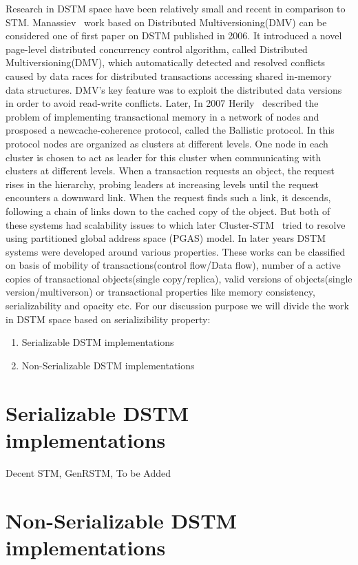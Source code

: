 \documentclass[12pt,english]{report}
\begin{document}
Research in DSTM space have been relatively small and recent in comparison to STM. Manassiev~\cite{Manassiev:2006:EDV:1122971.1123002} work based on Distributed Multiversioning(DMV) can be considered one of first paper on DSTM published in 2006. It
introduced a novel page-level distributed concurrency control algorithm, called Distributed Multiversioning(DMV), which automatically detected and resolved conflicts caused by data races for distributed transactions accessing shared in-memory data structures. DMV’s key feature was to exploit the distributed data versions in order to avoid read-write conflicts. Later,
In 2007 Herily~\cite{Herilhy:2007:BallisticProtocal} described the problem of implementing transactional memory in a network of nodes and prosposed a newcache-coherence protocol,
called the Ballistic protocol. In this protocol nodes are organized as clusters at different levels. One node in each cluster is chosen to act as leader for this cluster when communicating with clusters at different levels. When a transaction requests an object, the request rises in the hierarchy, probing leaders at increasing levels until the request encounters a downward link. When the request finds such a link, it descends, following a chain of links down to the cached copy of the object. But both of these systems had scalability issues to which later Cluster-STM~\cite{Bocchino:2008:STM:1345206.1345242} tried to resolve using partitioned global address space (PGAS) model. In later years DSTM systems were developed around various properties. These works can be classified on basis of mobility of transactions(control flow/Data flow), number of a active copies of transactional objects(single copy/replica), valid versions of objects(single version/multiverson) or transactional properties like memory consistency, serializability and opacity etc. For our discussion purpose we will divide the work in DSTM space based on serializibility property:
\begin{enumerate}
\item Serializable DSTM implementations
\item Non-Serializable DSTM implementations 
\end{enumerate}


\section{Serializable DSTM implementations}

Decent STM, GenRSTM, 
To be Added

\section{Non-Serializable DSTM implementations}
\end{document}
